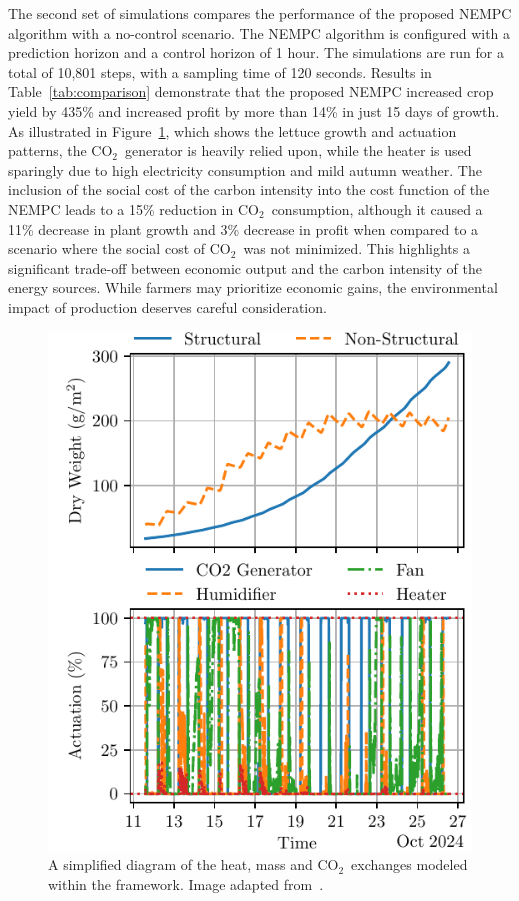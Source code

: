 \documentclass[conference]{IEEEtran}
\newcommand{\coo}{\ensuremath{\mathrm{CO_2}}}
\begin{document}
The second set of simulations compares the performance of the proposed NEMPC algorithm with a no-control scenario. The NEMPC algorithm is configured with a prediction horizon and a control horizon of 1 hour. The simulations are run for a total of 10,801 steps, with a sampling time of 120 seconds. Results in Table~\ref{tab:comparison} demonstrate that the proposed NEMPC increased crop yield by 435\% and increased profit by more than 14\% in just 15 days of growth. As illustrated in Figure~\ref{fig:control}, which shows the lettuce growth and actuation patterns, the \coo\ generator is heavily relied upon, while the heater is used sparingly due to high electricity consumption and mild autumn weather.
The inclusion of the social cost of the carbon intensity into the cost function of the NEMPC leads to a 15\% reduction in \coo\ consumption, although it caused a 11\% decrease in plant growth and 3\% decrease in profit when compared to a scenario where the social cost of \coo\ was not minimized. This highlights a significant trade-off between economic output and the carbon intensity of the energy sources. While farmers may prioritize economic gains, the environmental impact of production deserves careful consideration.
\begin{figure}\label{fig:control}
    \centering
    \includegraphics[width=\linewidth, trim=10 10 10 10]{figures/greenhouse_control-mpc_co2-N_30-steps_10801.pdf}
    \caption{A simplified diagram of the heat, mass and \coo\ exchanges modeled within the framework. Image adapted from~\cite{rmward61_2019}.}
\end{figure}
\end{document}
